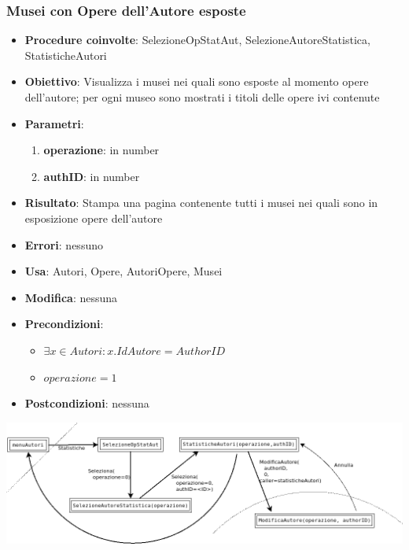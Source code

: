 \subsubsection{Musei con Opere dell’Autore esposte}
\label{MuseiOpereEsposte}
\begin{itemize}
	\item \textbf{Procedure coinvolte}: SelezioneOpStatAut, SelezioneAutoreStatistica, StatisticheAutori
	\item \textbf{Obiettivo}: Visualizza i musei nei quali sono esposte al momento opere dell'autore; per ogni museo sono mostrati i titoli delle opere ivi contenute
	\item \textbf{Parametri}:
	\begin{enumerate}
		\item \textbf{operazione}: in number
		\item \textbf{authID}: in number
	\end{enumerate}
	\item \textbf{Risultato}: Stampa una pagina contenente tutti i musei nei quali sono in esposizione opere dell'autore
	\item \textbf{Errori}: nessuno
	\item \textbf{Usa}: Autori, Opere, AutoriOpere, Musei
	\item \textbf{Modifica}: nessuna
	\item \textbf{Precondizioni}:
	\begin{itemize}
		\item $\exists x \in Autori : x.IdAutore = AuthorID$
		\item $operazione  = 1$
	\end{itemize}
	\item \textbf{Postcondizioni}: nessuna
\end{itemize}
\includegraphics[width=\textwidth]{img/statAutori-0.png}\\[1cm]

